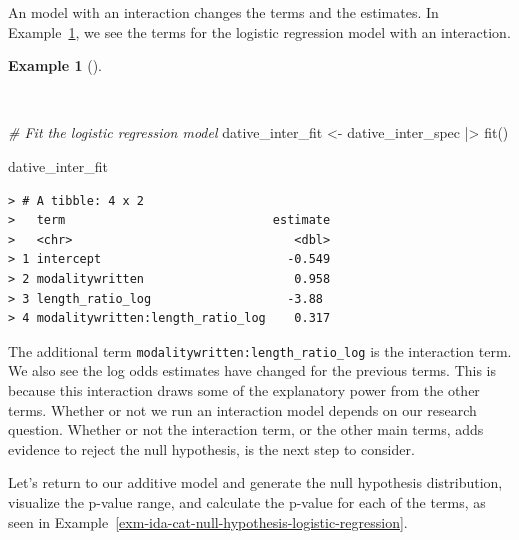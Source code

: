 \documentclass[
  letterpaper,
  DIV=11,
  numbers=noendperiod]{scrreprt}
\newenvironment{Shaded}{\begin{snugshade}}{\end{snugshade}}
\newcommand{\CommentTok}[1]{\textcolor[rgb]{0.00,0.00,0.00}{\textit{#1}}}
\newcommand{\FunctionTok}[1]{\textcolor[rgb]{0.00,0.00,0.00}{#1}}
\newcommand{\NormalTok}[1]{\textcolor[rgb]{0.00,0.00,0.00}{#1}}
\newcommand{\OtherTok}[1]{\textcolor[rgb]{0.00,0.00,0.00}{#1}}
\newcommand{\SpecialCharTok}[1]{\textcolor[rgb]{0.00,0.00,0.00}{#1}}
\theoremstyle{definition}
\newtheorem{example}{Example}[chapter]
\theoremstyle{remark}
\begin{document}
An model with an interaction changes the terms and the estimates. In
Example~\ref{exm-ida-cat-logistic-regression-interaction-terms}, we see
the terms for the logistic regression model with an interaction.

\begin{example}[]\protect\hypertarget{exm-ida-cat-logistic-regression-interaction-terms}{}\label{exm-ida-cat-logistic-regression-interaction-terms}

~

\begin{Shaded}
\begin{Highlighting}[]
\CommentTok{\# Fit the logistic regression model}
\NormalTok{dative\_inter\_fit }\OtherTok{\textless{}{-}}
\NormalTok{  dative\_inter\_spec }\SpecialCharTok{|\textgreater{}}
  \FunctionTok{fit}\NormalTok{()}

\NormalTok{dative\_inter\_fit}
\end{Highlighting}
\end{Shaded}

\begin{verbatim}
> # A tibble: 4 x 2
>   term                             estimate
>   <chr>                               <dbl>
> 1 intercept                          -0.549
> 2 modalitywritten                     0.958
> 3 length_ratio_log                   -3.88 
> 4 modalitywritten:length_ratio_log    0.317
\end{verbatim}

\end{example}

The additional term \texttt{modalitywritten:length\_ratio\_log} is the
interaction term. We also see the log odds estimates have changed for
the previous terms. This is because this interaction draws some of the
explanatory power from the other terms. Whether or not we run an
interaction model depends on our research question. Whether or not the
interaction term, or the other main terms, adds evidence to reject the
null hypothesis, is the next step to consider.

Let's return to our additive model and generate the null hypothesis
distribution, visualize the p-value range, and calculate the p-value for
each of the terms, as seen in
Example~\ref{exm-ida-cat-null-hypothesis-logistic-regression}.
\end{document}
